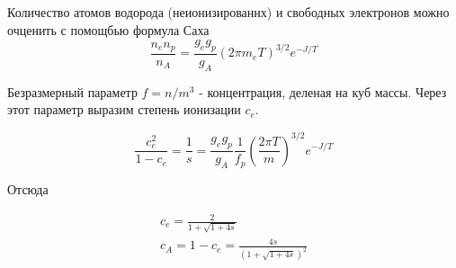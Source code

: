 Количество атомов водорода (неионизированнх) и свободных электронов можно очценить с помощбью формула Саха
\begin{equation*}
	\label{eq:sakha}
	\frac{n_e n_p}{n_A} = 
		\frac{g_e g_p}{g_A} (2\pi m_e T)^{3/2}e^{-J/T}
\end{equation*}

Безразмерный параметр $f = n/m^3$ - концентрация, деленая на куб массы.
Через этот параметр выразим степень ионизации $c_e$.

\begin{equation*}
	\label{eq:ion_degree_eq}
	\frac{c_e^2}{1-c_e} = \frac{1}{s} = \frac{g_e g_p}{g_A} \frac{1}{f_p}
	\left(\frac{2\pi T}{m}\right)^{3/2}e^{-J/T}
\end{equation*}

Отсюда

\begin{align*}
	\label{eq:ion_degree}
	c_e = \frac{2}{1+\sqrt{1+4s}}\\
	c_A = 1-c_e = \frac{4s}{(1+\sqrt{1+4s})^2}
\end{align*}

